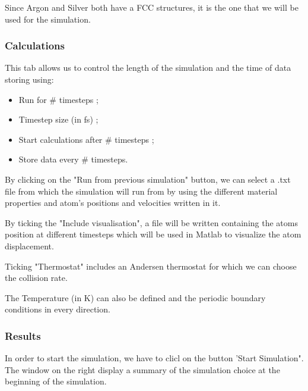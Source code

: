 Since Argon and Silver both have a FCC structures, it is the one that we will be used for the simulation.

\subsubsection{Calculations}

This tab allows us to control the length of the simulation and the time of data storing using:

\begin{itemize}
\item Run for \# timesteps ; 
\item Timestep size (in fs) ;
\item Start calculations after \# timesteps ; 
\item Store data every \# timesteps.
\end{itemize}

By clicking on the "Run from previous simulation" button, we can select a .txt file from which the simulation will run from by using the different material properties and atom's positions and velocities written in it.

By ticking the "Include visualisation", a file will be written containing the atoms position at different timesteps which will be used in Matlab to visualize the atom displacement.

Ticking "Thermostat" includes an Andersen thermostat for which we can choose the collision rate.

The Temperature (in K) can also be defined and the periodic boundary conditions in every direction.

\subsubsection{Results}

In order to start the simulation, we have to clicl on the button 'Start Simulation". The window on the right display a summary of the simulation choice at the beginning of the simulation.
